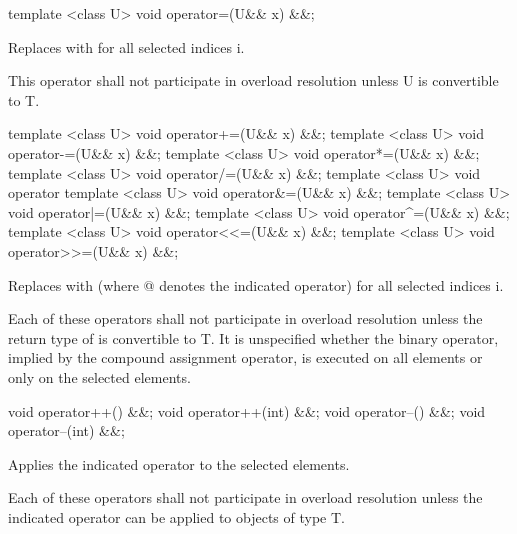 \begin{itemdecl}
template <class U> void operator=(U&& x) &&;
\end{itemdecl}
\begin{itemdescr}
  \pnum\effects
  Replaces  with  for all selected indices \code i.

  \pnum\remarks This operator shall not participate in overload resolution unless \type U is convertible to \type T.
\end{itemdescr}

\begin{itemdecl}
template <class U> void operator+=(U&& x) &&;
template <class U> void operator-=(U&& x) &&;
template <class U> void operator*=(U&& x) &&;
template <class U> void operator/=(U&& x) &&;
template <class U> void operator%
template <class U> void operator&=(U&& x) &&;
template <class U> void operator|=(U&& x) &&;
template <class U> void operator^=(U&& x) &&;
template <class U> void operator<<=(U&& x) &&;
template <class U> void operator>>=(U&& x) &&;
\end{itemdecl}
\begin{itemdescr}
  \pnum\effects
  Replaces  with  (where \code @ denotes the indicated operator) for all selected indices \code i.

  \pnum\remarks Each of these operators shall not participate in overload resolution unless
  the return type of  is convertible to \type T.
  It is unspecified whether the binary operator, implied by the compound assignment operator, is executed on all elements or only on the selected elements.
\end{itemdescr}

\begin{itemdecl}
void operator++() &&;
void operator++(int) &&;
void operator--() &&;
void operator--(int) &&;
\end{itemdecl}
\begin{itemdescr}
  \pnum\effects Applies the indicated operator to the selected elements.

  \pnum\remarks Each of these operators shall not participate in overload resolution unless the indicated operator can be applied to objects of type \type T.
\end{itemdescr}

